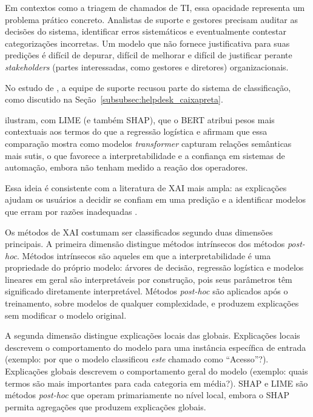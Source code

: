 \documentclass[
    12pt,                %
    openright,           %
    oneside,             %
    a4paper,             %
    english,             %
    brazil               %
]{abntex2}
\begin{document}
Em contextos como a triagem de chamados de TI, essa opacidade representa um problema prático concreto. Analistas de suporte e gestores precisam auditar as decisões do sistema, identificar erros sistemáticos e eventualmente contestar categorizações incorretas. Um modelo que não fornece justificativa para suas predições é difícil de depurar, difícil de melhorar e difícil de justificar perante \textit{stakeholders} (partes interessadas, como gestores e diretores) organizacionais.

\label{subsubsec:xai_confianca}

No estudo de , a equipe de suporte recusou parte do sistema de classificação, como discutido na Seção~\ref{subsubsec:helpdesk_caixapreta}. 

 ilustram, com LIME (e também SHAP), que o BERT atribui pesos mais contextuais aos termos do que a regressão logística e afirmam que essa comparação mostra como modelos \textit{transformer} capturam relações semânticas mais sutis, o que favorece a interpretabilidade e a confiança em sistemas de automação, embora não tenham medido a reação dos operadores.

Essa ideia é consistente com a literatura de XAI mais ampla: as explicações
 ajudam os usuários a decidir se confiam em uma predição e a identificar modelos 
 que erram por razões inadequadas \cite{ribeiro2016}.


\label{subsubsec:xai_taxonomia}

Os métodos de XAI costumam ser classificados segundo duas dimensões principais. A primeira dimensão distingue métodos intrínsecos dos métodos \textit{post-hoc}. Métodos intrínsecos são aqueles em que a interpretabilidade é uma propriedade do próprio modelo: árvores de decisão, regressão logística e modelos lineares em geral são interpretáveis por construção, pois seus parâmetros têm significado diretamente interpretável. Métodos \textit{post-hoc} são aplicados após o treinamento, sobre modelos de qualquer complexidade, e produzem explicações sem modificar o modelo original.

A segunda dimensão distingue explicações locais das globais. Explicações locais descrevem o comportamento do modelo para uma instância específica de entrada (exemplo: por que o modelo classificou \textit{este} chamado como ``Acesso''?). Explicações globais descrevem o comportamento geral do modelo (exemplo: quais termos são mais importantes para cada categoria em média?). SHAP e LIME são métodos \textit{post-hoc} que operam primariamente no nível local, embora o SHAP permita agregações que produzem explicações globais.
\end{document}
